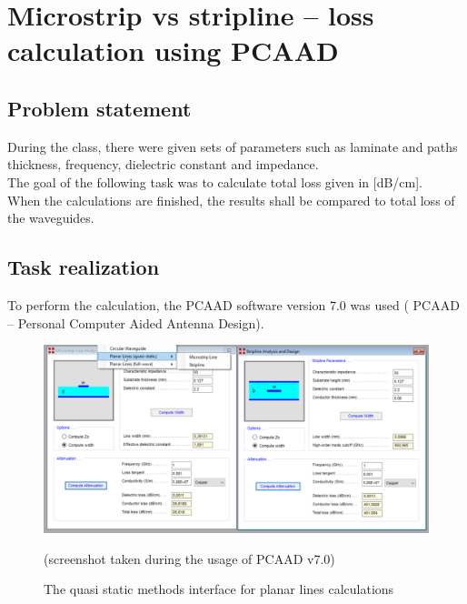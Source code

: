 \documentclass[eng,printmode]{mgr}
\begin{document}
\newpage
\chapter{Microstrip vs stripline -- loss calculation using PCAAD}
\section{Problem statement}
During the class, there were given sets of parameters such as laminate and paths thickness, frequency, dielectric constant and impedance.\\The goal of the following task was to calculate total loss given in [dB/cm].\\
When the calculations are finished, the results shall be compared to total loss of the waveguides.
\\
\section{Task realization}
To perform the calculation, the PCAAD software version 7.0 was used ( PCAAD -- Personal Computer Aided Antenna Design).
\begin{figure}[h]
	\centering
	\includegraphics[width=0.7\linewidth]{pcaad}
	\caption{The quasi static methods interface for planar lines calculations}
	(screenshot taken during the usage of PCAAD v7.0)
	\label{fig:pcaad}
\end{figure}
\end{document}
